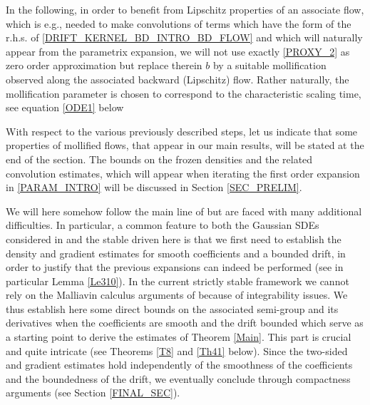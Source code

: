 \documentclass[11pt]{article}
\newcommand{\eg}{e.g.,\xspace}
\numberwithin{equation}{section}\providecommand{\asymp}{\mathrel{\sim}}
\theoremstyle{plain}
\theoremstyle{definition}
\newcommand\1{{\mathbf{1}}}
\begin{document}
{In the following, in order to benefit from Lipschitz properties of an associate flow, which is \eg needed to make convolutions of terms which have the form of the r.h.s. of \eqref{DRIFT_KERNEL_BD_INTRO_BD_FLOW} and which will naturally appear from the parametrix expansion, we will not use exactly \eqref{PROXY_2} as zero order approximation but replace therein $b $ by a suitable mollification observed along the associated backward (Lipschitz) flow. Rather naturally, the mollification parameter is chosen to correspond to the characteristic scaling time, see equation \eqref{ODE1} below}

{With respect to the various previously described steps, let us indicate that some properties of mollified flows, that appear in our main results, will be stated at the end of the section. The bounds on the frozen densities and the related convolution estimates, which will appear when iterating the first order expansion in \eqref{PARAM_INTRO} will be discussed in Section \ref{SEC_PRELIM}.}

We will here somehow follow the main line of \cite{meno:pesc:zhan:20} but are faced with many additional difficulties. In particular, a common feature to both the Gaussian SDEs considered in \cite{meno:pesc:zhan:20} and the stable driven here is that we first need to establish the density and gradient estimates for smooth coefficients and a bounded drift, in order to justify that the previous expansions can indeed be performed (see in particular Lemma \ref{Le310}).
In the current strictly stable framework we cannot rely on the Malliavin calculus arguments of \cite{meno:pesc:zhan:20} because of integrability issues.
We thus establish here some direct bounds on the associated semi-group and its derivatives when the coefficients are smooth and {the drift bounded} which serve as a starting point to derive the estimates of Theorem \ref{Main}. This part is crucial and quite intricate (see Theorems {\ref{T8} and} \ref{Th41} below).
Since the two-sided and gradient estimates hold independently of the smoothness of the coefficients and the boundedness of the drift, we eventually conclude through compactness arguments (see Section \ref{FINAL_SEC}).
\end{document}
